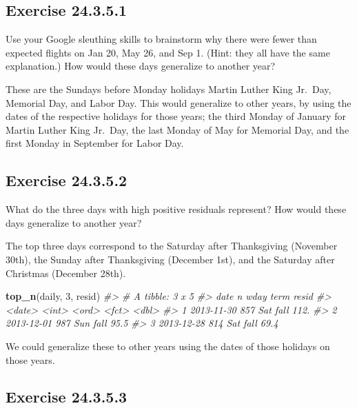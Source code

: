 \documentclass[]{book}
\newenvironment{Shaded}{\begin{snugshade}}{\end{snugshade}}
\newcommand{\CommentTok}[1]{\textcolor[rgb]{0.56,0.35,0.01}{\textit{#1}}}
\newcommand{\DecValTok}[1]{\textcolor[rgb]{0.00,0.00,0.81}{#1}}
\newcommand{\KeywordTok}[1]{\textcolor[rgb]{0.13,0.29,0.53}{\textbf{#1}}}
\newcommand{\NormalTok}[1]{#1}
\theoremstyle{plain}
\theoremstyle{remark}
\begin{document}
\hypertarget{exercise-24.3.5.1}{%
\subsection*{\texorpdfstring{Exercise
{24.3.5.1}}{Exercise 24.3.5.1}}\label{exercise-24.3.5.1}}

Use your Google sleuthing skills to brainstorm why there were fewer than
expected flights on Jan 20, May 26, and Sep 1. (Hint: they all have the
same explanation.) How would these days generalize to another year?

These are the Sundays before Monday holidays Martin Luther King Jr.~Day,
Memorial Day, and Labor Day. This would generalize to other years, by
using the dates of the respective holidays for those years; the third
Monday of January for Martin Luther King Jr.~Day, the last Monday of May
for Memorial Day, and the first Monday in September for Labor Day.

\hypertarget{exercise-24.3.5.2}{%
\subsection*{\texorpdfstring{Exercise
{24.3.5.2}}{Exercise 24.3.5.2}}\label{exercise-24.3.5.2}}

What do the three days with high positive residuals represent? How would
these days generalize to another year?

The top three days correspond to the Saturday after Thanksgiving
(November 30th), the Sunday after Thanksgiving (December 1st), and the
Saturday after Christmas (December 28th).

\begin{Shaded}
\begin{Highlighting}[]
\KeywordTok{top_n}\NormalTok{(daily, }\DecValTok{3}\NormalTok{, resid)}
\CommentTok{#> # A tibble: 3 x 5}
\CommentTok{#>   date           n wday  term  resid}
\CommentTok{#>   <date>     <int> <ord> <fct> <dbl>}
\CommentTok{#> 1 2013-11-30   857 Sat   fall  112. }
\CommentTok{#> 2 2013-12-01   987 Sun   fall   95.5}
\CommentTok{#> 3 2013-12-28   814 Sat   fall   69.4}
\end{Highlighting}
\end{Shaded}

We could generalize these to other years using the dates of those
holidays on those years.

\hypertarget{exercise-24.3.5.3}{%
\subsection*{\texorpdfstring{Exercise
{24.3.5.3}}{Exercise 24.3.5.3}}\label{exercise-24.3.5.3}}
\end{document}
